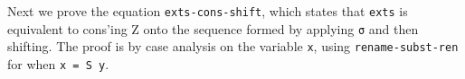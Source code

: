 Next we prove the equation \texttt{exts-cons-shift}, which states that
\texttt{exts} is equivalent to cons'ing Z onto the sequence formed by
applying \texttt{σ} and then shifting. The proof is by case analysis on
the variable \texttt{x}, using \texttt{rename-subst-ren} for when
\texttt{x\ =\ S\ y}.

\begin{fence}
\begin{code}%
\>[0]%
\>[1233I]\AgdaSymbol{:}\AgdaSpace{}%
\AgdaSpace{}%
\AgdaSymbol{\}}\AgdaSpace{}%
\AgdaSymbol{\{}\AgdaSpace{}%
\AgdaSymbol{\}}\AgdaSpace{}%
\AgdaSymbol{\{}\AgdaSpace{}%
\AgdaSymbol{:}\AgdaSpace{}%
\AgdaSpace{}%
\AgdaSpace{}%
\AgdaSymbol{\}}\<%
\\
\>[.][@{}l@{}]\<[1233I]%
\>[16]\AgdaSpace{}%
\AgdaSpace{}%
\AgdaSpace{}%
\AgdaSymbol{\{}\AgdaSymbol{\}}\AgdaSpace{}%
\AgdaSymbol{\{}\AgdaSymbol{\}}\AgdaSpace{}%
\AgdaSpace{}%
\AgdaSymbol{(}\AgdaSpace{}%
\AgdaSpace{}%
\AgdaSpace{}%
\AgdaSymbol{(}\AgdaSpace{}%
\AgdaSpace{}%
\AgdaSymbol{))}\<%
\\
\>[0]\AgdaSpace{}%
\AgdaSymbol{=}\AgdaSpace{}%
\AgdaSpace{}%
\AgdaSpace{}%
\AgdaSpace{}%
\AgdaSpace{}%
\AgdaSymbol{\{}\AgdaSpace{}%
\AgdaSymbol{=}\AgdaSpace{}%
\AgdaSymbol{\}}\<%
\\
\>[0][@{}l@{\AgdaIndent{0}}]%
\>[2]\<%
\\
%
\>[2]\AgdaSpace{}%
\AgdaSymbol{:}\AgdaSpace{}%
\AgdaSpace{}%
\AgdaSymbol{\}}%
\>[1265I]\AgdaSymbol{\{}\AgdaSpace{}%
\AgdaSymbol{\}}\AgdaSpace{}%
\AgdaSymbol{\{}\AgdaSpace{}%
\AgdaSymbol{:}\AgdaSpace{}%
\AgdaSpace{}%
\AgdaSpace{}%
\AgdaSymbol{\}}\AgdaSpace{}%
\AgdaSymbol{\{}\AgdaSpace{}%
\AgdaSymbol{:}\AgdaSpace{}%
\AgdaSpace{}%
\AgdaOperator{\AgdaInductiveConstructor{,}}\AgdaSpace{}%
\AgdaSpace{}%
\AgdaSpace{}%

\end{code}
\end{fence}
